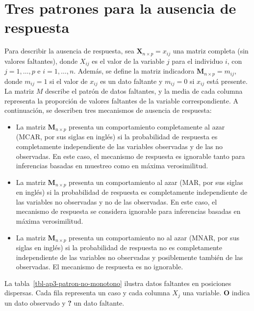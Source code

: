 \documentclass[
  spanish,
  11pt,
  letterpaper,
  oneside,
  open=any]{scrbook}
\providecommand{\tightlist}{%
  \setlength{\itemsep}{0pt}\setlength{\parskip}{0pt}}
\begin{document}
\section{Tres patrones para la ausencia de
respuesta}\label{tres-patrones-para-la-ausencia-de-respuesta}

Para describir la ausencia de respuesta, sea
\(\boldsymbol{X}_{n \times p} = x_{ij}\) una matriz completa (sin
valores faltantes), donde \(X_{ij}\) es el valor de la variable \(j\)
para el individuo \(i\), con \(j=1, \dots, p\) e \(i=1, \dots, n\).
Además, se define la matriz indicadora
\(\boldsymbol{M}_{n \times p} = m_{ij}\), donde \(m_{ij} = 1\) si el
valor de \(x_{ij}\) es un dato faltante y \(m_{ij}=0\) si \(x_{ij}\)
está presente. La matriz \(M\) describe el patrón de datos faltantes, y
la media de cada columna representa la proporción de valores faltantes
de la variable correspondiente. A continuación, se describen tres
mecanismos de ausencia de respuesta:

\begin{itemize}
\tightlist
\item
  La matriz \(\boldsymbol{M}_{n \times p}\) presenta un comportamiento
  completamente al azar (MCAR, por sus siglas en inglés) si la
  probabilidad de respuesta es completamente independiente de las
  variables observadas y de las no observadas. En este caso, el
  mecanismo de respuesta es ignorable tanto para inferencias basadas en
  muestreo como en máxima verosimilitud.
\item
  La matriz \(\boldsymbol{M}_{n \times p}\) presenta un comportamiento
  al azar (MAR, por sus siglas en inglés) si la probabilidad de
  respuesta es completamente independiente de las variables no
  observadas y no de las observadas. En este caso, el mecanismo de
  respuesta se considera ignorable para inferencias basadas en máxima
  verosimilitud.
\item
  La matriz \(\boldsymbol{M}_{n \times p}\) presenta un comportamiento
  no al azar (MNAR, por sus siglas en inglés) si la probabilidad de
  respuesta no es completamente independiente de las variables no
  observadas y posiblemente también de las observadas. El mecanismo de
  respuesta es no ignorable.
\end{itemize}

La tabla~\ref{tbl-ap3-patron-no-monotono} ilustra datos faltantes en
posiciones dispersas. Cada fila representa un caso y cada columna
\(X_j\) una variable. \textbf{O} indica un dato observado y \textbf{?}
un dato faltante.
\end{document}

